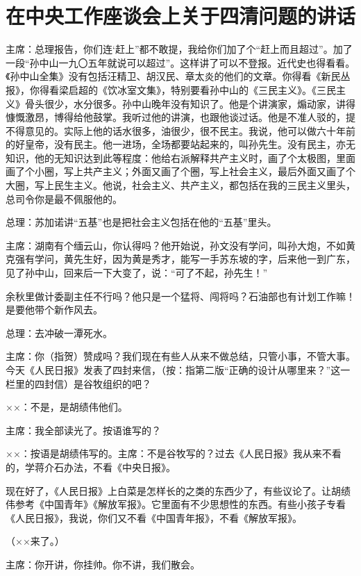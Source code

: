 \section[在中央工作座谈会上关于四清问题的讲话（一九六四年十二月二十日）]{在中央工作座谈会上关于四清问题的讲话}


主席：总理报告，你们连‘赶上”都不敢提，我给你们加了个“赶上而且超过”。加了一段“孙中山一九〇五年就说可以超过”。这样讲了可以不登报。近代史也得看看。《孙中山全集》没有包括汪精卫、胡汉民、章太炎的他们的文章。你得看《新民丛报》，你得看梁启超的《饮冰室文集》，特别要看孙中山的《三民主义》。《三民主义》骨头很少，水分很多。孙中山晚年没有知识了。他是个讲演家，煽动家，讲得慷慨激昂，博得给他鼓掌。我听过他的讲演，也跟他谈过话。他是不准人驳的，提不得意见的。实际上他的话水很多，油很少，很不民主。我说，他可以做六十年前的好皇帝，没有民主。他一进场，全场都要站起来的，叫孙先生。没有民主，亦无知识，他的无知识达到此等程度：他给右派解释共产主义时，画了个太极图，里面画了个小圈，写上共产主义；外面又画了个圈，写上社会主义，最后外面又画了个大圈，写上民生主义。他说，社会主义、共产主义，都包括在我的三民主义里头，总司令你是最不佩服他的。

总理：苏加诺讲“五基”也是把社会主义包括在他的“五基”里头。

主席：湖南有个缅云山，你认得吗？他开始说，孙文没有学问，叫孙大炮，不如黄克强有学问，黄先生好，因为黄是秀才，能写一手苏东坡的字，后来他一到广东，见了孙中山，回来后一下大变了，说：“可了不起，孙先生！”

余秋里做计委副主任不行吗？他只是一个猛将、闯将吗？石油部也有计划工作嘛！是要他带个新作风去。

总理：去冲破一潭死水。

主席：你（指贺）赞成吗？我们现在有些人从来不做总结，只管小事，不管大事。今天《人民日报》发表了四封来信，（按：指第二版“正确的设计从哪里来？”这一栏里的四封信）是谷牧组织的吧？

××：不是，是胡绩伟他们。

主席：我全部读光了。按语谁写的？

××：按语是胡绩伟写的。主席：不是谷牧写的？过去《人民日报》我从来不看的，学蒋介石办法，不看《中央日报》。

现在好了，《人民日报》上白菜是怎样长的之类的东西少了，有些议论了。让胡绩伟参考《中国青年》《解放军报》。它里面有不少思想性的东西。有些小孩子专看《人民日报》，我说，你们又不看《中国青年报》，不看《解放军报》。

（××来了。）

主席：你开讲，你挂帅。你不讲，我们散会。

